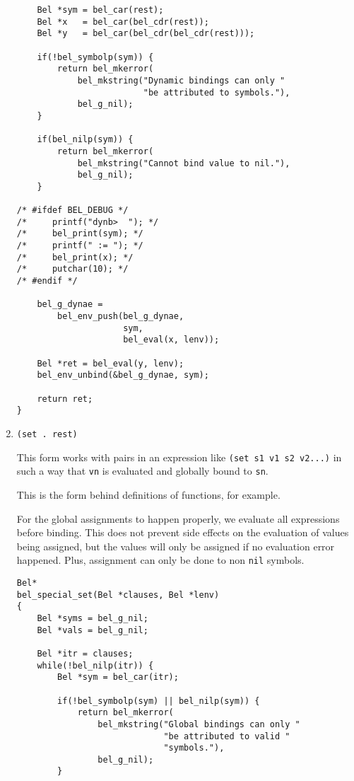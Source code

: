 \documentclass[openright,a4paper,twoside,12pt]{memoir}
\begin{document}
\begin{enumerate}
\begin{verbatim}
    Bel *sym = bel_car(rest);
    Bel *x   = bel_car(bel_cdr(rest));
    Bel *y   = bel_car(bel_cdr(bel_cdr(rest)));

    if(!bel_symbolp(sym)) {
        return bel_mkerror(
            bel_mkstring("Dynamic bindings can only "
                         "be attributed to symbols."),
            bel_g_nil);
    }

    if(bel_nilp(sym)) {
        return bel_mkerror(
            bel_mkstring("Cannot bind value to nil."),
            bel_g_nil);
    }

/* #ifdef BEL_DEBUG */
/*     printf("dynb>  "); */
/*     bel_print(sym); */
/*     printf(" := "); */
/*     bel_print(x); */
/*     putchar(10); */
/* #endif */
    
    bel_g_dynae =
        bel_env_push(bel_g_dynae,
                     sym,
                     bel_eval(x, lenv));

    Bel *ret = bel_eval(y, lenv);
    bel_env_unbind(&bel_g_dynae, sym);
    
    return ret;
}
\end{verbatim}

\item \texttt{(set . rest)}
\label{sec:orgf202557}

This form works with pairs in an expression like \texttt{(set s1 v1 s2
v2...)} in such a way that \texttt{vn} is evaluated and globally bound to \texttt{sn}.

This is the form behind definitions of functions, for example.

For the global assignments to happen properly, we evaluate all
expressions before binding. This does not prevent side effects on the
evaluation of values being assigned, but the values will only be
assigned if no evaluation error happened. Plus, assignment can only be
done to non \texttt{nil} symbols.

\begin{verbatim}
Bel*
bel_special_set(Bel *clauses, Bel *lenv)
{
    Bel *syms = bel_g_nil;
    Bel *vals = bel_g_nil;

    Bel *itr = clauses;
    while(!bel_nilp(itr)) {
        Bel *sym = bel_car(itr);

        if(!bel_symbolp(sym) || bel_nilp(sym)) {
            return bel_mkerror(
                bel_mkstring("Global bindings can only "
                             "be attributed to valid "
                             "symbols."),
                bel_g_nil);
        }
        

\end{verbatim}
\end{enumerate}
\end{document}
